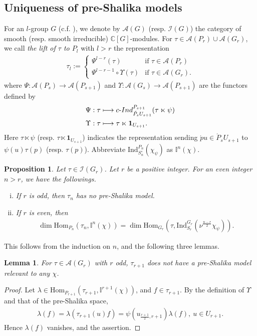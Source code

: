\documentclass[11pt]{amsart}
\newcommand\C{{\mathbb{C}}}%
\newcommand\Ib{{\mathbb{I}}}
\newcommand\1{\mathbf{1}}
\newcommand\nid{\noindent}
\newcommand\ac{\acute}
\newcommand\lt{\ltimes}%
\newcommand\In{{\mathrm{Ind}}}%
\newcommand\Hom{{\mathrm{Hom}}}%
\newcommand\cI{{\rm c\mathchar`- Ind}}
\newcommand\Ir{{\mathscr{I}}}
\newcommand\Alg{{\mathscr{A}}}
\numberwithin{equation}{section}
\newtheorem{prop}[thm]{Proposition}
\newtheorem{lem}[thm]{Lemma}
\begin{document}
\subsection{Uniqueness of pre-Shalika models}
For an $l$-group $G$ (c.f. \cite{B-Z}), we denote by $\Alg(G)$ (resp. $\Ir(G)$) the category of smooth (resp. smooth irreducible) $\C[G]$-modules.
For $\tau \in \Alg(P_r) \cup \Alg(G_r)$, we call {\it the lift of $\tau$ to $P_l$} with $l > r$ the representation 
\begin{align*}
\tau_l := 
\begin{cases}
\Psi^{l-r} (\tau) & \mbox{if $\tau \in \Alg(P_r)$} \\
\Psi^{l-r-1}\circ \Upsilon(\tau) & \mbox{if $\tau \in \Alg(G_r)$.} 
\end{cases}
\end{align*}
where $\Psi:\Alg(P_s) \to \Alg(P_{s+1})$ and $\Upsilon:\Alg(G_s) \to \Alg(P_{s+1})$ are the functors defined by 
\begin{align*}
&\Psi: \tau \longmapsto \cI_{\ac{P}_{s}U_{s+1}}^{P_{s+1}} (\tau \lt \psi) \\
& \Upsilon: \tau \longmapsto \tau \lt \1_{U_{s+1}}.
\end{align*} 
Here $\tau \lt \psi$ (resp. $\tau \lt \1_{U_{s+1}}$) indicates the representation sending $\ac{p} u \in \ac{P}_sU_{s+1}$ to $\psi(u)\tau(p)$ (resp. $\tau(p)$).
Abbreviate $\In_{S^\circ_{n}}^{P_{n}} (\chi_\psi)$ as $\Ib^{n}(\chi)$.
\begin{prop}\label{prop:redG}
Let $\tau \in \Ir(G_{r})$.
Let $r$ be a positive integer.
For an even integer $n > r$, we have the followings.
\begin{enumerate}[i)]
\item If $r$ is odd, then $\tau_{n}$ has no pre-Shalika model.
\item If $r$ is even, then  
\begin{align*}
\dim \Hom_{P_{n}}(\tau_{n}, \Ib^{n}(\chi)) = \dim \Hom_{G_{r}}(\tau, \In_{S_{r}}^{G_r}(\nu^{\frac{n- r}{2}}\chi_\psi)).
\end{align*} 
\end{enumerate}
\end{prop}
\nid
This follows from the induction on $n$, and the following three lemmas.
\begin{lem}
For $\tau \in \Alg(G_{r})$ with $r$ odd, $\tau_{r+1}$ does not have a pre-Shalika model relevant to any $\chi$.
\end{lem}
\begin{proof}
Let $\lambda \in \Hom_{P_{r+1}}(\tau_{r+1},\Ib^{r+1}(\chi))$, and $f \in \tau_{r+1}$.
By the definition of $\Upsilon$ and that of the pre-Shalika space, 
\begin{align*}
\lambda(f) = \lambda(\tau_{r+1}(u) f) = \psi(u_{\frac{r+1}{2},r+1})\lambda(f), \ u \in U_{r+1}.
\end{align*}
Hence $\lambda(f)$ vanishes, and the assertion.
\end{proof}
\end{document}
